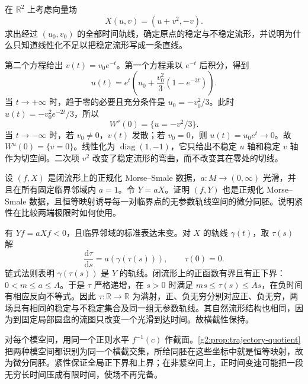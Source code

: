 \BookExercises

\begin{exercise}\label{g2:ex:nonlinear-stable-graph}
	在 \(\mathbb R^2\) 上考虑向量场
	\[
		X(u,v)=(u+v^2,-v).
	\]
	求出经过 \((u_0,v_0)\) 的全部时间轨线，确定原点的稳定与不稳定流形，并说明为什么只知道线性化不足以把稳定流形写成一条直线。
\end{exercise}
\begin{solution}
	第二个方程给出 \(v(t)=v_0e^{-t}\)。第一个方程乘以 \(e^{-t}\) 后积分，得到
	\[
		u(t)=e^t\left(u_0+\frac{v_0^2}{3}(1-e^{-3t})\right).
	\]
	当 \(t\to+\infty\) 时，趋于零的必要且充分条件是 \(u_0=-v_0^2/3\)。此时 \(u(t)=-v_0^2e^{-2t}/3\)，所以
	\[
		W^s(0)=\{u=-v^2/3\}.
	\]
	当 \(t\to-\infty\) 时，若 \(v_0\ne0\)，\(v(t)\) 发散；若 \(v_0=0\)，则 \(u(t)=u_0e^t\to0\)。故 \(W^u(0)=\{v=0\}\)。线性化为 \(\operatorname{diag}(1,-1)\)，它只给出不稳定 \(u\) 轴和稳定 \(v\) 轴作为切空间。二次项 \(v^2\) 改变了稳定流形的弯曲，而不改变其在零处的切线。
\end{solution}

\begin{exercise}\label{g2:ex:morse-positive-time-change}
	设 \((f,X)\) 是闭流形上的正规化 Morse--Smale 数据，\(a:M\to(0,\infty)\) 光滑，并且在所有固定临界邻域内 \(a=1\)。令 \(Y=aX\)。证明 \((f,Y)\) 也是正规化 Morse--Smale 数据，且恒等映射诱导每一对临界点的无参数轨线空间的微分同胚。说明紧性在比较两端极限时如何使用。
\end{exercise}
\begin{solution}
	有 \(Yf=aXf<0\)，且临界邻域的标准表达未变。对 \(X\) 的轨线 \(\gamma(t)\)，取 \(\tau(s)\) 解
	\[
		\frac{\mathrm d\tau}{\mathrm ds}=a(\gamma(\tau(s))),\qquad \tau(0)=0.
	\]
	链式法则表明 \(\gamma(\tau(s))\) 是 \(Y\) 的轨线。闭流形上的正函数有界且有正下界：\(0<m\le a\le A\)。于是 \(\tau\) 严格递增，在 \(s>0\) 时满足 \(ms\le\tau(s)\le As\)，在负时间有相应反向不等式。因此 \(\tau:\mathbb R\to\mathbb R\) 为满射，正、负无穷分别对应正、负无穷，两场具有相同的稳定与不稳定集合及同一组无参数轨线。其自然流形结构也相同，因为到固定局部圆盘的流图只改变一个光滑到达时间。故横截性保持。

	对每个模空间，用同一个正则水平 \(f^{-1}(c)\) 作截面。\cref{g2:prop:trajectory-quotient}把两种模空间都识别为同一个横截交集，所给同胚在这些坐标中就是恒等映射，故为微分同胚。紧性保证全局正下界和上界；在非紧空间上，正时间变速可能把一段无穷长时间压成有限时间，使场不再完备。
\end{solution}

